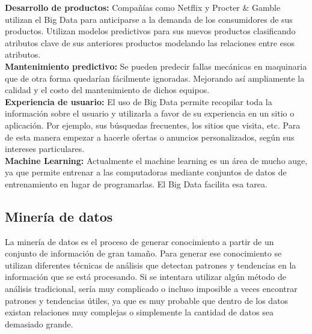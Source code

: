 \begin{UClist}
	\UCli \textbf{Desarrollo de productos:} Compañías como Netflix y Procter \& Gamble utilizan el Big Data para anticiparse a la demanda de los consumidores de sus productos. Utilizan modelos predictivos para sus nuevos productos clasificando atributos clave de sus anteriores productos modelando las relaciones entre esos atributos.\\
	\UCli \textbf{Mantenimiento predictivo:} Se pueden predecir fallas mecánicas en maquinaria que de otra forma quedarían fácilmente ignoradas. Mejorando así ampliamente la calidad y el costo del mantenimiento de dichos equipos.\\
	\UCli \textbf{Experiencia de usuario:} El uso de Big Data permite recopilar toda la información sobre el usuario y utilizarla a favor de su experiencia en un sitio o aplicación. Por ejemplo, sus búsquedas frecuentes, los sitios que visita, etc. Para de esta manera empezar a hacerle ofertas o anuncios personalizados, según sus intereses particulares.\\
	\UCli \textbf{Machine Learning:} Actualmente el machine learning es un área de mucho auge, ya que permite entrenar a las computadoras mediante conjuntos de datos de entrenamiento en lugar de programarlas. El Big Data facilita esa tarea.\\
\end{UClist}

\subsection{Minería de datos}
La minería de datos es el proceso de generar conocimiento a partir de un conjunto de información de gran tamaño. Para generar ese conocimiento se utilizan diferentes técnicas de análisis que detectan patrones y tendencias en la información que se está procesando. Si se intentara utilizar algún método de análisis tradicional, sería muy complicado o incluso imposible a veces encontrar patrones y tendencias útiles, ya que es muy probable que dentro de los datos existan relaciones muy complejas o simplemente la cantidad de datos sea demasiado grande.\\


